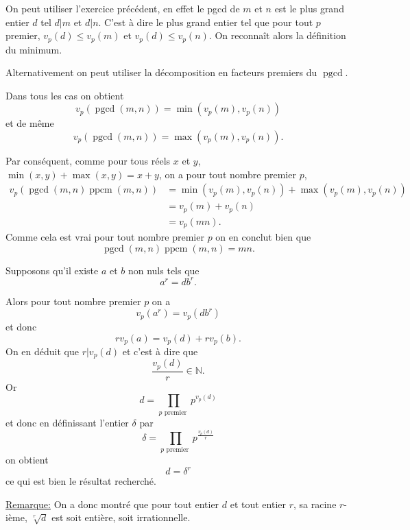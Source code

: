 \begin{sol}
    On peut utiliser l'exercice précédent, en effet le pgcd de $m$ et $n$ est le plus grand entier $d$ tel $d |m$ et $d| n$. C'est à dire le plus grand entier tel que pour tout $p$ premier, $v_p(d)\leq v_p(m)$ et $v_p(d) \leq v_p(n)$. On reconnaît alors la définition du minimum.

    Alternativement on peut utiliser la décomposition en facteurs premiers du $\operatorname{pgcd}$.

    Dans tous les cas on obtient
    \[\boxed{v_p\left(\operatorname{pgcd}(m,n)\right) = \min \left(v_p(m),v_p(n)\right)}\]
    et de même
    \[\boxed{v_p\left(\operatorname{pgcd}(m,n)\right) = \max \left(v_p(m),v_p(n)\right)}.\]

    Par conséquent, comme pour tous réels $x$ et $y$, $\min(x,y) + \max(x,y) = x+y$, on a pour tout nombre premier $p$,
    \[\begin{aligned}
            v_p(\operatorname{pgcd}(m,n) \operatorname{ppcm}(m,n)) & = \min \left(v_p(m),v_p(n)\right) +\max \left(v_p(m),v_p(n)\right) \\
                                       & = v_p(m) + v_p(n)                                                  \\
                                       & = v_p(mn).
        \end{aligned}\]
    Comme cela est vrai pour tout nombre premier $p$ on en conclut bien que
    \[\boxed{\operatorname{pgcd}(m,n) \operatorname{ppcm}(m,n) = m n}.\]
\end{sol}

\begin{sol}
    Supposons qu'il existe $a$ et $b$ non nuls tels que
    \[a^r = d b^r.\]

    Alors pour tout nombre premier $p$ on a
    \[v_p(a^r) = v_p(d b^r)\]
    et donc
    \[r v_p(a) = v_p(d)+r v_p(b).\]
    On en déduit que $r | v_p(d)$ et c'est à dire que
    \[\frac{v_p(d)}{r} \in \mathbb{N}.\]
    Or
    \[ d = \prod_{ p \text{ premier }} p^{v_p(d)}\]
    et donc en définissant l'entier $\delta$ par
    \[ \delta= \prod_{ p \text{ premier }} p^{\frac{v_p(d)}{r}}\]
    on obtient
    \[ \boxed{d = \delta^r}\]
    ce qui est bien le résultat recherché.

    \underline{Remarque:}
    On a donc montré que pour tout entier $d$ et tout entier $r$, sa racine $r$-ième,  $\sqrt[r]{d}$ est soit entière, soit irrationnelle.
\end{sol}

